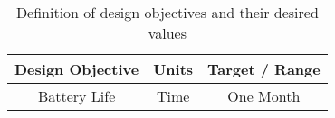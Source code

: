 \begin{table}[!h]
\begin{center}
\begin{tabular}{|c|c|c|}
\hline
Design Objective & Units & Target / Range \\
\hline
Battery Life & Time & One Month \\
\hline
\end{tabular}
\caption{Definition of design objectives and their desired values}
\label{table:desobj_tbl}
\end{center}
\end{table}
